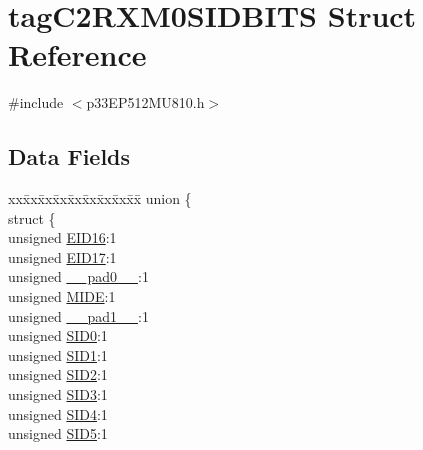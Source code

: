 \hypertarget{structtag_c2_r_x_m0_s_i_d_b_i_t_s}{}\section{tag\+C2\+R\+X\+M0\+S\+I\+D\+B\+I\+TS Struct Reference}
\label{structtag_c2_r_x_m0_s_i_d_b_i_t_s}


{\ttfamily \#include $<$p33\+E\+P512\+M\+U810.\+h$>$}

\subsection*{Data Fields}
\begin{DoxyCompactItemize}
\item 
\begin{tabbing}
xx\=xx\=xx\=xx\=xx\=xx\=xx\=xx\=xx\=\kill
union \{\\
\>struct \{\\
\>\>unsigned \hyperlink{structtag_c2_r_x_m0_s_i_d_b_i_t_s_a6dd5663b0c9838c56db040560ca0efa1}{EID16}:1\\
\>\>unsigned \hyperlink{structtag_c2_r_x_m0_s_i_d_b_i_t_s_aa648615464b0eb29967529333eee9fd9}{EID17}:1\\
\>\>unsigned \hyperlink{structtag_c2_r_x_m0_s_i_d_b_i_t_s_adf71f3d8410c1f1dbbc96680a92c49af}{\_\_pad0\_\_}:1\\
\>\>unsigned \hyperlink{structtag_c2_r_x_m0_s_i_d_b_i_t_s_a3febd6bba68dc9477425e6ef6020e88a}{MIDE}:1\\
\>\>unsigned \hyperlink{structtag_c2_r_x_m0_s_i_d_b_i_t_s_acaf2d0924a107ec6e8d2e31febaf66f9}{\_\_pad1\_\_}:1\\
\>\>unsigned \hyperlink{structtag_c2_r_x_m0_s_i_d_b_i_t_s_a1ca276ac15df60e1f7b9a6d0011ade93}{SID0}:1\\
\>\>unsigned \hyperlink{structtag_c2_r_x_m0_s_i_d_b_i_t_s_a3405d354f81391f879648f69f504dfc8}{SID1}:1\\
\>\>unsigned \hyperlink{structtag_c2_r_x_m0_s_i_d_b_i_t_s_ad744966dfc49307f731b7045b01b94e5}{SID2}:1\\
\>\>unsigned \hyperlink{structtag_c2_r_x_m0_s_i_d_b_i_t_s_a9345f3e64720be93e83d8dfc827f3f45}{SID3}:1\\
\>\>unsigned \hyperlink{structtag_c2_r_x_m0_s_i_d_b_i_t_s_aefb106fed4bb40e2c3c71ac612c554e3}{SID4}:1\\
\>\>unsigned \hyperlink{structtag_c2_r_x_m0_s_i_d_b_i_t_s_a0f221b3c9612231686bf87ccdcec8489}{SID5}:1\\

\end{tabbing}
\end{DoxyCompactItemize}
